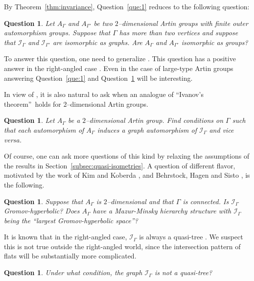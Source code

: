 \documentclass[11pt]{amsart}
\newcommand {\I}{\mathcal I}
\newtheorem{question}[theorem]{Question}
\theoremstyle{definition}
\begin{document}
By Theorem~\ref{thm:invariance}, Question~\ref{que:1} reduces to the following question:
\begin{question}
	\label{que:2}
	Let $A_\Gamma$ and $A_{\Gamma'}$ be two $2$--dimensional Artin groups with finite outer automorphism groups. Suppose that $\Gamma$ has more than two vertices and suppose that $\I_{\Gamma}$ and $\I_{\Gamma'}$ are isomorphic as graphs. Are $A_\Gamma$ and $A_{\Gamma'}$ isomorphic as groups?
\end{question}

To answer this question, one need to generalize \cite[Proposition 23]{MR2174269}. This question has a positive answer in the right-angled case \cite{bestvina2008asymptotic,MR3692971}. Even in the case of large-type Artin groups answering Question~\ref{que:1} and Question~\ref{que:2} will be interesting.

In view of \cite[Proposition 23]{MR2174269}, it is also natural to ask when an analogue of \textquotedblleft Ivanov's theorem\textquotedblright\ holds for $2$--dimensional Artin groups.
\begin{question}
	\label{que:3}
	Let $A_\Gamma$ be a $2$--dimensional Artin group. Find conditions on $\Gamma$ such that each automorphism of $A_\Gamma$ induces a graph automorphism of $\I_\Gamma$ and vice versa.
\end{question}

Of course,	 one can ask more questions of this kind by relaxing the assumptions of the results in Section~\ref{subsec:quasi-isometries}. A question of different flavor, motivated by the work of Kim and Koberda \cite{kim2014geometry}, and Behrstock, Hagen and Sisto \cite{MR3650081}, is the following.

\begin{question}
	Suppose that $A_\Gamma$ is $2$--dimensional and that $\Gamma$ is connected. Is $\I_\Gamma$ Gromov-hyperbolic? Does $A_\Gamma$ have a Mazur-Minsky hierarchy structure with $\I_\Gamma$ being the \textquotedblleft largest Gromov-hyperbolic space\textquotedblright?
\end{question}

It is known that in the right-angled case, $\I_\Gamma$ is always a quasi-tree \cite{kim2014geometry}. We suspect this is not true outside the right-angled world, since the intersection pattern of flats will be substantially more complicated. 

\begin{question}
Under what condition, the graph $\I_\Gamma$ is not a quasi-tree?
\end{question}


{}

\end{document}
